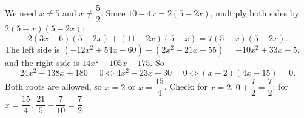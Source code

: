 We need $x\ne5$ and $x\ne\dfrac{5}{2}$. Since $10-4x=2(5-2x)$, multiply both sides by $2(5-x)(5-2x)$:
\[
2(3x-6)(5-2x)+(11-2x)(5-x)=7(5-x)(5-2x).
\]
The left side is $(-12x^2+54x-60)+(2x^2-21x+55)=-10x^2+33x-5$, and the right side is $14x^2-105x+175$. So
\[
24x^2-138x+180=0\iff4x^2-23x+30=0\iff(x-2)(4x-15)=0 .
\]
Both roots are allowed, so $x=\boxed{2}$ or $x=\boxed{\dfrac{15}{4}}$. Check: for $x=2$, $0+\dfrac{7}{2}=\dfrac{7}{2}$; for $x=\dfrac{15}{4}$, $\dfrac{21}{5}-\dfrac{7}{10}=\dfrac{7}{2}$.
